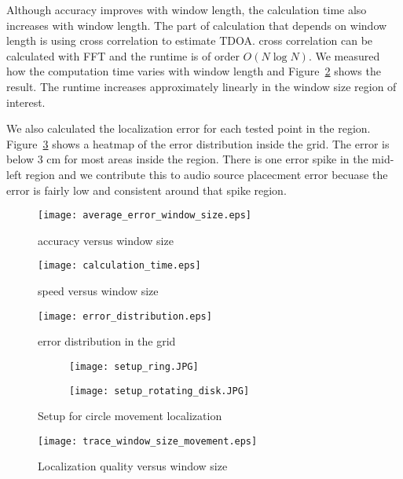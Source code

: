 Although accuracy improves with window length, the calculation time also increases with window length. The part of calculation that depends on window length is using cross correlation to estimate TDOA. cross correlation can be calculated with FFT and the runtime is of order $O(N\log N)$. We measured how the computation time varies with window length and Figure~\ref{fig:speed_vs_window} shows the result. The runtime increases approximately linearly in the window size region of interest.

We also calculated the localization error for each tested point in the region. Figure~\ref{fig:error_distribution} shows a heatmap of the error distribution inside the grid. The error is below $3$ cm for most areas inside the region. There is one error spike in the mid-left region and we contribute this to audio source placecment error becuase the error is fairly low and consistent around that spike region.

\begin{figure}[]
\texttt{[image: average\_error\_window\_size.eps]}
\caption{accuracy versus window size}
\label{fig:accuracy_vs_window}
\end{figure}

\begin{figure}[]
\texttt{[image: calculation\_time.eps]}
\caption{speed versus window size}
\label{fig:speed_vs_window}
\end{figure}


\begin{figure}[]
\texttt{[image: error\_distribution.eps]}
\caption{error distribution in the grid}
\label{fig:error_distribution}
\end{figure}

\begin{figure}[]
  \centering
  \begin{subfigure}[]{.2\textwidth}
    \texttt{[image: setup\_ring.JPG]}
  \end{subfigure}
  \begin{subfigure}[]{.2\textwidth}
    \texttt{[image: setup\_rotating\_disk.JPG]}
  \end{subfigure}
  \caption{Setup for circle movement localization}
  \label{fig:setup_circle}
\end{figure}


\begin{figure*}[]
\centering
  \texttt{[image: trace\_window\_size\_movement.eps]}
\caption{Localization quality versus window size}\label{fig:wn}
\label{fig:trace_win_circle}
\end{figure*}


